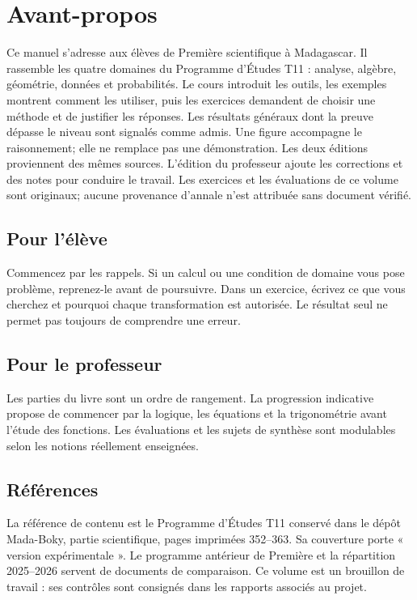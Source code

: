 \chapter*{Avant-propos}
Ce manuel s’adresse aux élèves de Première scientifique à Madagascar. Il rassemble les quatre domaines du Programme d’Études T11 : analyse, algèbre, géométrie, données et probabilités.
Le cours introduit les outils, les exemples montrent comment les utiliser, puis les exercices demandent de choisir une méthode et de justifier les réponses. Les résultats généraux dont la preuve dépasse le niveau sont signalés comme admis. Une figure accompagne le raisonnement; elle ne remplace pas une démonstration.
Les deux éditions proviennent des mêmes sources. L’édition du professeur ajoute les corrections et des notes pour conduire le travail. Les exercices et les évaluations de ce volume sont originaux; aucune provenance d’annale n’est attribuée sans document vérifié.
\section*{Pour l’élève}
Commencez par les rappels. Si un calcul ou une condition de domaine vous pose problème, reprenez-le avant de poursuivre. Dans un exercice, écrivez ce que vous cherchez et pourquoi chaque transformation est autorisée. Le résultat seul ne permet pas toujours de comprendre une erreur.
\section*{Pour le professeur}
Les parties du livre sont un ordre de rangement. La progression indicative propose de commencer par la logique, les équations et la trigonométrie avant l’étude des fonctions. Les évaluations et les sujets de synthèse sont modulables selon les notions réellement enseignées.
\section*{Références}
La référence de contenu est le Programme d’Études T11 conservé dans le dépôt Mada-Boky, partie scientifique, pages imprimées 352–363. Sa couverture porte « version expérimentale ». Le programme antérieur de Première et la répartition 2025–2026 servent de documents de comparaison. Ce volume est un brouillon de travail : ses contrôles sont consignés dans les rapports associés au projet.
